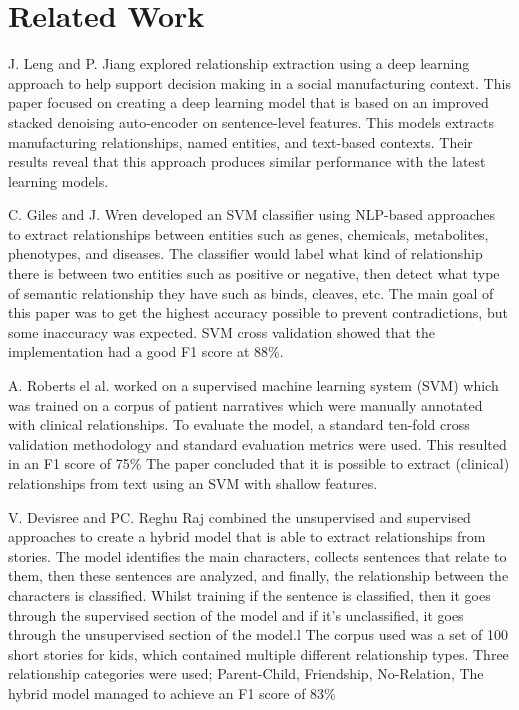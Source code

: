\documentclass[fleqn,moreauthors,10pt]{ds_report}
\begin{document}
\section*{Related Work}

J. Leng and P. Jiang explored relationship extraction using a deep learning approach to help support decision making in a social manufacturing context. This paper focused on creating a deep learning model that is based on an improved stacked denoising auto-encoder on sentence-level features. This models extracts manufacturing relationships, named entities, and text-based contexts. Their results reveal that this approach produces similar performance with the latest learning models.~\cite{leng2016deep}

C. Giles and J. Wren developed an SVM classifier using NLP-based approaches to extract relationships between entities such as genes, chemicals, metabolites, phenotypes, and diseases. The classifier would label what kind of relationship there is between two entities such as positive or negative, then detect what type of semantic relationship they have such as binds, cleaves, etc. The main goal of this paper was to get the highest accuracy possible to prevent contradictions, but some inaccuracy was expected. SVM cross validation showed that the implementation had a good F1 score at 88\%.~\cite{giles2008large}

A. Roberts el al. worked on a supervised machine learning system (SVM) which was trained on a corpus of patient narratives which were manually annotated with clinical relationships. To evaluate the model, a standard ten-fold cross validation methodology and standard evaluation metrics were used. This resulted in an F1 score of 75\% The paper concluded that it is possible to extract (clinical) relationships from text using an SVM with shallow features. ~\cite{roberts2008extracting}

V. Devisree and PC. Reghu Raj combined the unsupervised and supervised approaches to create a hybrid model that is able to extract relationships from stories. The model identifies the main characters, collects sentences that relate to them, then these sentences are analyzed, and finally, the relationship between the characters is classified. Whilst training if the sentence is classified, then it goes through the supervised section of the model and if it's unclassified, it goes through the unsupervised section of the model.l The corpus used was a set of 100 short stories for kids, which contained multiple different relationship types. Three relationship categories were used; Parent-Child, Friendship, No-Relation, The hybrid model managed to achieve an F1 score of 83\%  ~\cite{devisree2016hybrid}
\end{document}
